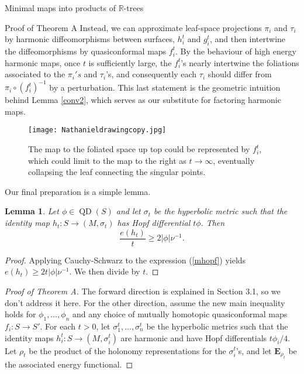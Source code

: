 \documentclass[10pt]{amsart}
\newcommand{\R}{\mathbb R}
\newtheorem{lem}[thm]{Lemma}
\DeclareMathOperator{\QD}{\textrm{QD}}
\theoremstyle{definition}
\begin{document}
\begin{section}{Minimal maps into products of $\R$-trees}
\begin{subsection}{Proof of Theorem A}
Instead, we can approximate leaf-space projections $\pi_i$ and $\tau_i$ by harmonic diffeomorphisms between surfaces, $h_i^t$ and $g_i^t$, and then intertwine the diffeomorphisms by quasiconformal maps $f_i^t$. By the behaviour of high energy harmonic maps, once $t$ is sufficiently large, the $f_i^t$'s nearly intertwine the foliations associated to the $\pi_i's$ and $\tau_i$'s, and consequently each $\tau_i$ should differ from $\pi_i\circ (f_i^t)^{-1}$ by a perturbation. This last statement is the geometric intuition behind Lemma \ref{conv2}, which serves as our substitute for factoring harmonic maps.
 \begin{figure}[ht]
     \centering
     \texttt{[image: Nathanieldrawingcopy.jpg]}
     \caption{The map to the foliated space up top could be represented by $f_i^t,$ which could limit to the map to the right as $t\to\infty$, eventually collapsing the leaf connecting the singular points.}
 \end{figure}  
Our final preparation is a simple lemma.
\begin{lem}\label{easylemma}
    Let $\phi\in \QD(S)$ and let $\sigma_t$ be the hyperbolic metric such that the identity map $h_t:S\to (M,\sigma_t)$ has Hopf differential $t\phi.$ Then $$\frac{e(h_t)}{t}\geq 2|\phi|\nu^{-1}.$$
\end{lem}
\begin{proof}
    Applying Cauchy-Schwarz to the expression (\ref{mhopf}) yields $e(h_t)\geq 2t|\phi|\nu^{-1}.$ We then divide by $t.$
\end{proof}

\begin{proof}[Proof of Theorem A]
The forward direction is explained in Section 3.1, so we don't address it here. For the other direction, assume the new main inequality holds for $\phi_1,\dots, \phi_n$ and any choice of mutually homotopic quasiconformal maps $f_i:S\to S'$.  For each $t>0$, let $\sigma_1^t,\dots,\sigma_n^t$ be the hyperbolic metrics such that the identity maps $h_i^t:S\to (M,\sigma_i^t)$ are harmonic and have Hopf differentials $t\phi_i/4$. Let $\rho_t$ be the product of the holonomy representations for the $\sigma_i^t$'s, and let $\mathbf{E}_{\rho_t}$ be the associated energy functional.


\end{proof}
\end{subsection}
\end{section}
\end{document}
